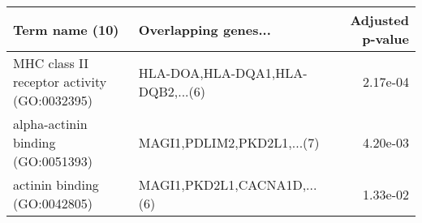 \begin{tabular}{llr}
\toprule
                             Term name (10) &             Overlapping genes... &  Adjusted p-value \\
\midrule
MHC class II receptor activity (GO:0032395) & HLA-DOA,HLA-DQA1,HLA-DQB2,...(6) &          2.17e-04 \\
         alpha-actinin binding (GO:0051393) &       MAGI1,PDLIM2,PKD2L1,...(7) &          4.20e-03 \\
               actinin binding (GO:0042805) &      MAGI1,PKD2L1,CACNA1D,...(6) &          1.33e-02 \\
\bottomrule
\end{tabular}
